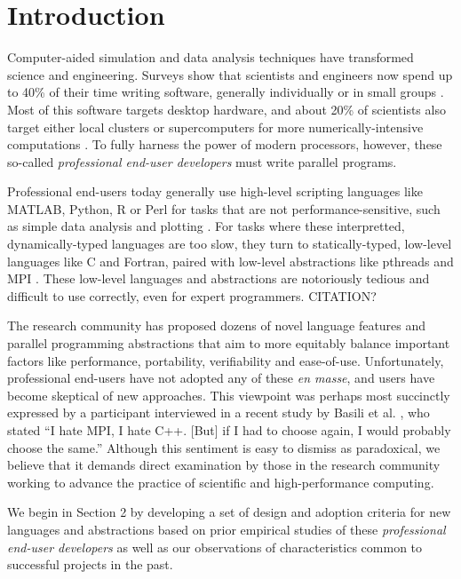 \documentclass[10pt, conference, compsocconf]{IEEEtran}
\begin{document}
\section{Introduction}

Computer-aided simulation and data analysis techniques have transformed science and engineering. Surveys show that scientists and engineers now spend up to 40\% of their time writing software, generally individually or in small groups \cite{howison2011scientific}\cite{hannay2009scientists}. Most of this software targets desktop hardware, and about 20\% of scientists also target either local clusters or super\-computers for more numerically-intensive computations \cite{hannay2009scientists}. To fully harness the power of modern processors, however, these so-called {\em professional end-user developers} \cite{segal2007some} must write parallel programs.

Professional end-users today generally use high-level scripting languages like MATLAB, Python, R or Perl for tasks that are not performance-sensitive, such as simple data analysis and plotting \cite{nguyen2010survey}. For tasks where these interpretted, dynamically-typed languages are too slow, they turn to statically-typed, low-level languages like C and Fortran, paired with low-level abstractions like pthreads and MPI \cite{4222616}\cite{basili2008understanding}. These low-level languages and abstractions are notoriously tedious and difficult to use correctly, even for expert programmers. {\color{red} CITATION?}

The research community has proposed dozens of novel language features and parallel programming abstractions that aim to  more equitably balance important factors like performance, portability, verifiability and ease-of-use. Unfortunately, professional end-users have not adopted any of these {\em en masse}, and users have become  skeptical of new approaches. This viewpoint was perhaps most succinctly expressed by a participant interviewed in a recent study by Basili et al. \cite{basili2008understanding}, who stated ``I hate MPI, I hate C++. [But] if I had to choose again, I would probably choose the same.'' Although this sentiment is easy to dismiss as paradoxical, we believe that it demands direct examination by those in the research community working to advance the practice of scientific and high-performance computing. 

We begin in Section 2 by developing a set of design and adoption criteria for new languages and abstractions based on prior empirical studies of these {\it professional end-user developers} as well as our observations of characteristics common to successful projects in the past. 
\end{document}

